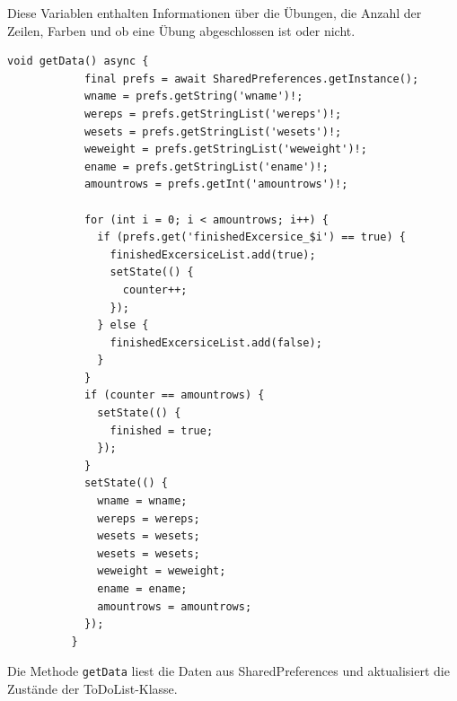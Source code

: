     Diese Variablen enthalten Informationen über die Übungen, die Anzahl der Zeilen, Farben und ob eine Übung abgeschlossen ist oder nicht.
    \\
    
    
    \begin{lstlisting}[caption=To-Do-Liste get Methode,label=lst:impl:frontend:qrcode]
        void getData() async {
            final prefs = await SharedPreferences.getInstance();
            wname = prefs.getString('wname')!;
            wereps = prefs.getStringList('wereps')!;
            wesets = prefs.getStringList('wesets')!;
            weweight = prefs.getStringList('weweight')!;
            ename = prefs.getStringList('ename')!;
            amountrows = prefs.getInt('amountrows')!;
        
            for (int i = 0; i < amountrows; i++) {
              if (prefs.get('finishedExcersice_$i') == true) {
                finishedExcersiceList.add(true);
                setState(() {
                  counter++;
                });
              } else {
                finishedExcersiceList.add(false);
              }
            }
            if (counter == amountrows) {
              setState(() {
                finished = true;
              });
            }
            setState(() {
              wname = wname;
              wereps = wereps;
              wesets = wesets;
              wesets = wesets;
              weweight = weweight;
              ename = ename;
              amountrows = amountrows;
            });
          }
    \end{lstlisting}
    
    Die Methode \texttt{getData} liest die Daten aus SharedPreferences und aktualisiert die Zustände der ToDoList-Klasse. 
    
